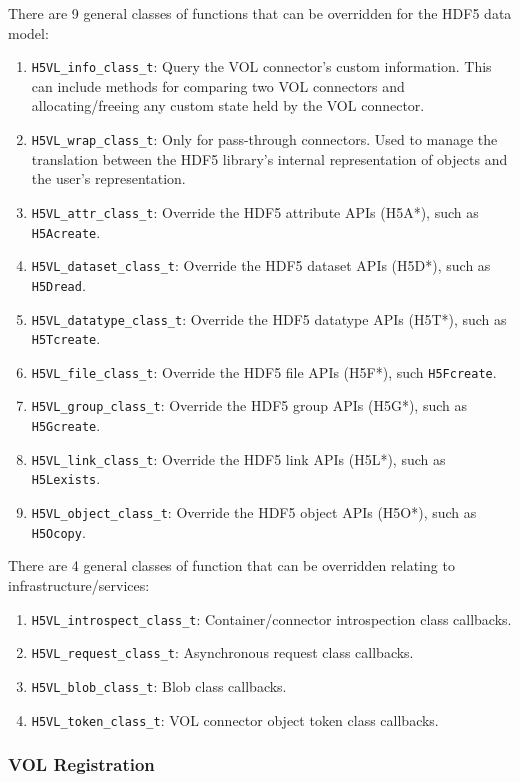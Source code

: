 There are 9 general classes of functions that can be overridden for the HDF5 data model:
\begin{enumerate}
    \item \texttt{H5VL\_info\_class\_t}: Query the VOL connector's custom information. This can include methods for comparing two VOL connectors and allocating/freeing any custom state held by the VOL connector.
    \item \texttt{H5VL\_wrap\_class\_t}: Only for pass-through connectors. Used to manage the translation between the HDF5 library's internal representation of objects and the user's representation.
    \item \texttt{H5VL\_attr\_class\_t}: Override the HDF5 attribute APIs (H5A*), such as \texttt{H5Acreate}.
    \item \texttt{H5VL\_dataset\_class\_t}: Override the HDF5 dataset APIs (H5D*), such as \texttt{H5Dread}.
    \item \texttt{H5VL\_datatype\_class\_t}: Override the HDF5 datatype APIs (H5T*), such as \texttt{H5Tcreate}.
    \item \texttt{H5VL\_file\_class\_t}: Override the HDF5 file APIs (H5F*), such \texttt{H5Fcreate}.
    \item \texttt{H5VL\_group\_class\_t}: Override the HDF5 group APIs (H5G*), such as \texttt{H5Gcreate}.
    \item \texttt{H5VL\_link\_class\_t}: Override the HDF5 link APIs (H5L*), such as \texttt{H5Lexists}.
    \item \texttt{H5VL\_object\_class\_t}: Override the HDF5 object APIs (H5O*), such as \texttt{H5Ocopy}.
\end{enumerate}

There are 4 general classes of function that can be overridden relating to infrastructure/services:
\begin{enumerate}
    \item \texttt{H5VL\_introspect\_class\_t}: Container/connector introspection class callbacks.
    \item \texttt{H5VL\_request\_class\_t}: Asynchronous request class callbacks.
    \item \texttt{H5VL\_blob\_class\_t}: Blob class callbacks.
    \item \texttt{H5VL\_token\_class\_t}: VOL connector object token class callbacks.
\end{enumerate}

\subsubsection{VOL Registration}

